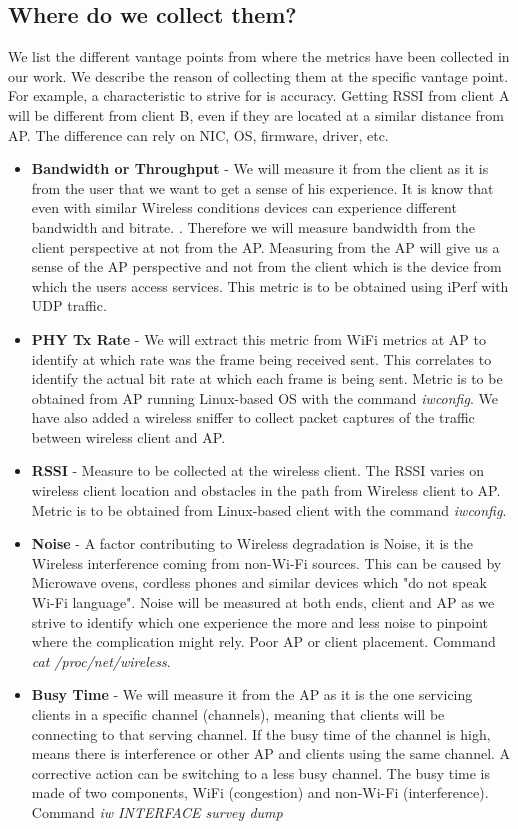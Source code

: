 \subsection{Where do we collect them?}

We list the different vantage points from where the metrics have been collected in our work. We describe the reason of collecting them at the specific vantage point. For example, a characteristic to strive for is accuracy. Getting RSSI from client A will be different from client B, even if they are located at a similar distance from AP. The difference can rely on NIC, OS, firmware, driver, etc.

\begin{itemize}
	\item \textbf{Bandwidth or Throughput} - We will measure it from the client as it is from the user that we want to get a sense of his experience. It is know that even with similar Wireless conditions devices can experience different bandwidth and bitrate. \cite{measuring_user_traffic}. Therefore we will measure bandwidth from the client perspective at not from the AP. Measuring from the AP will give us a sense of the AP perspective and not from the client which is the device from which the users access services. This metric is to be obtained using iPerf with UDP traffic.
	\item \textbf{PHY Tx Rate} - We will extract this metric from WiFi metrics at AP to identify at which rate was the frame being received sent. This correlates to identify the actual bit rate at which each frame is being sent. Metric is to be obtained from AP running Linux-based OS with the command \emph{iwconfig}. We have also added a wireless sniffer to collect packet captures of the traffic between wireless client and AP.
	\item \textbf{RSSI} - Measure to be collected at the wireless client. The RSSI varies on wireless client location and obstacles in the path from Wireless client to AP. Metric is to be obtained from Linux-based client with the command \emph{iwconfig}.
	\item \textbf{Noise} - A factor contributing to Wireless degradation is Noise, it is the Wireless interference coming from non-Wi-Fi sources. This can be caused by Microwave ovens, cordless phones and similar devices which "do not speak Wi-Fi language". Noise will be measured at both ends, client and AP as we strive to identify which one experience the more and less noise to pinpoint where the complication might rely. Poor AP or client placement. Command \emph{cat /proc/net/wireless}.
	\item \textbf{Busy Time} - We will measure it from the AP as it is the one servicing clients in a specific channel (channels), meaning that clients will be connecting to that serving channel. If the busy time of the channel is high, means there is interference or other AP and clients using the same channel. A corrective action can be switching to a less busy channel. The busy time is made of two components, WiFi (congestion) and non-Wi-Fi (interference). Command \emph{iw INTERFACE survey dump}	
		
\end{itemize}

